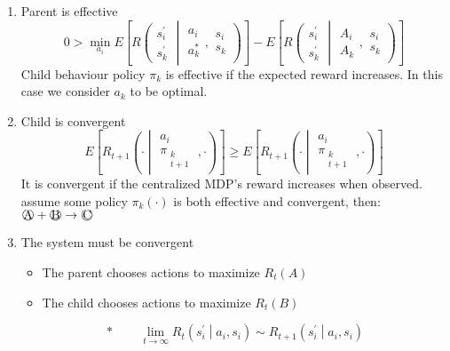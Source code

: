 \begin{enumerate}[label=\Alph*)]
\item Parent is effective
\begin{equation*}
0 > \min_{a_i}
E\left[ R\left( \begin{array}{c} s^\prime_i \\ s^\prime_k \end{array} \middle| \begin{array}{c} a_i \\ a^\ast_k \end{array}, \begin{array}{c} s_i \\ s_k \end{array} \right) \right] 
- E\left[ R\left( \begin{array}{c} s^\prime_i \\ s^\prime_k \end{array} \middle| \begin{array}{c} A_i \\ A_k \end{array}, \begin{array}{c} s_i \\ s_k \end{array} \right) \right]
\end{equation*}
Child behaviour policy $\pi_k$ is effective if the expected reward increases. In this case we consider $a_k$ to be optimal.
\item Child is convergent
\begin{equation*}
E\left[ R_{t+1}\left( 
\cdot 
\middle| \begin{array}{c} a_i \\
\pi_{\substack{k\\t+1}} \end{array},\cdot
\right)
\right] \ge E\left[ R_{t+1}\left( \cdot \middle|
\begin{array}{c} a_i \\
 \pi_{\substack{k\\t+1}} \end{array},\cdot\right)\right]
\end{equation*}
It is convergent if the centralized MDP's reward increases when observed.\\
 assume some policy $\pi_k(\cdot)$ is both effective and convergent, then:\\
$\circled{\text{A}}+\circled{\text{B}}\rightarrow\circled{\text{C}}$\\
\item The system must be convergent
\begin{itemize}
\item The parent chooses actions to maximize $R_t(A)$
\item The child chooses actions to maximize $R_t(B)$
\end{itemize}
\begin{equation*}
\boxed{\ast}\qquad \lim_{t\rightarrow\infty} R_t\left( s^\prime_i \middle| a_i, s_i \right) \sim R_{t+1}\left( s^\prime_i \middle| a_i, s_i \right)
\end{equation*}
\end{enumerate}
